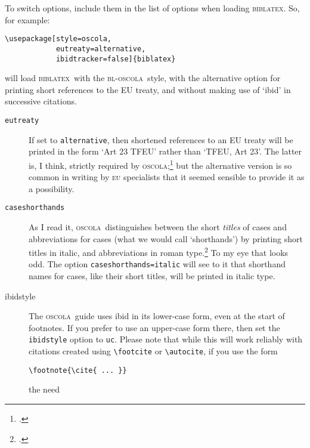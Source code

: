 \documentclass[a4paper,
               11pt,
	       DIV=1,			   
	       footinclude=false]
	      {scrartcl}
\newcommand{\oscola}{\textsc{bl-oscola}}
\newcommand{\biblatex}{\textsc{biblatex}}
\newcommand{\oscolashort}{\textsc{oscola}\nocite{oscola}}
\newcounter{egcounter}\setcounter{egcounter}{0}
\newlength{\boxwidth}
\newenvironment{bibexample}[1][]
{%
  \medskip\par\noindent\ignorespaces
  \marginpar{[\refstepcounter{egcounter}\arabic{egcounter}]\label{#1}}%
  \setlength{\boxwidth}{0.95\linewidth}%
  \addtolength{\boxwidth}{-2\fboxsep}
  \addtolength{\boxwidth}{-2\fboxrule}
  \begin{lrbox}{\boxcontainer}
  \begin{minipage}[t]{\boxwidth}%
}
{%
  \end{minipage}\end{lrbox}%
  \colorbox{gray!30}{\usebox{\boxcontainer}}
  \par\medskip}
\begin{document}
To switch options, include them in the list of options when loading
\biblatex. So, for example: 
\begin{bibexample}[optionseg]
\begin{verbatim} 
\usepackage[style=oscola,
            eutreaty=alternative, 
            ibidtracker=false]{biblatex} 
\end{verbatim} 
\end{bibexample}
\noindent will load \biblatex\ with the \oscola\ style, with the alternative option
for printing short references to the EU treaty, and without making use
of `ibid' in successive citations.

\begin{description}
\item[\texttt{eutreaty}] If\label{options} set to
  \texttt{alternative}, then shortened references to an EU treaty will
  be printed in the form `Art 23 TFEU' rather than `TFEU, Art 23'. The
  latter is, I think, strictly required by
  \oscolashort;\footcite[29]{oscola} but the alternative version is so
  common in writing by \textsc{eu} specialists that it seemed sensible
  to provide it as a possibility.
\item[\texttt{caseshorthands}]
  As I read it, \oscolashort\ distinguishes between the short
  \emph{titles} of cases and abbreviations for cases (what we would
  call `shorthands') by printing short titles in italic, and
  abbreviations in roman type.\footcite[See `example 4'][15]{oscola}
  To my eye that looks odd. The option \texttt{caseshorthands=italic}
  will see to it that shorthand names for cases, like their short
  titles, will be printed in italic type.
\item[ibidstyle]
  The \oscolashort\ guide uses ibid in its lower-case form, even at
  the start of footnotes. If you prefer to use an upper-case form
  there, then set the \texttt{ibidstyle} option to \texttt{uc}. Please
  note that while this will work reliably with citations created using
  \verb|\footcite| or \verb|\autocite|, if you use the
  form\begin{verbatim}\footnote{\cite{ ... }}\end{verbatim}the need

\end{description}
\end{document}
